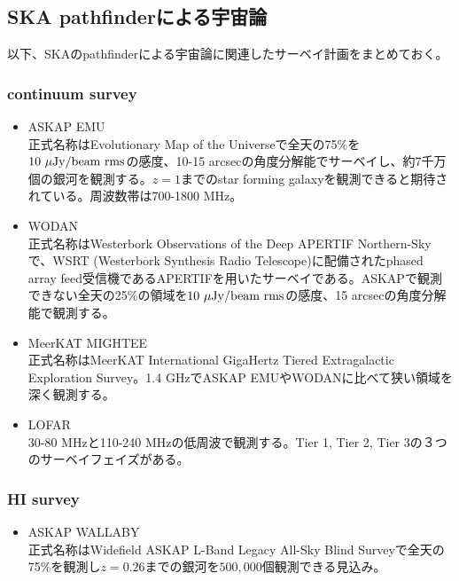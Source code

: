 \subsection{SKA pathfinderによる宇宙論}\label{cosmology.s1.ss3}

以下、SKAのpathfinderによる宇宙論に関連したサーベイ計画をまとめておく。

\subsubsection{continuum survey}
\begin{itemize}
\item ASKAP EMU\\
正式名称はEvolutionary Map of the Universeで全天の75\%を$10~\mu{\rm Jy/beam~rms}$の感度、10-15 arcsecの角度分解能でサーベイし、約7千万個の銀河を観測する。$z=1$までのstar forming galaxyを観測できると期待されている。周波数帯は700-1800 MHz。
\item WODAN\\
正式名称はWesterbork Observations of the Deep APERTIF Northern-Skyで、WSRT (Westerbork Synthesis Radio Telescope)に配備されたphased array feed受信機であるAPERTIFを用いたサーベイである。ASKAPで観測できない全天の25\%の領域を$10~\mu{\rm Jy/beam~rms}$の感度、15 arcsecの角度分解能で観測する。
\item MeerKAT MIGHTEE\\
正式名称はMeerKAT International GigaHertz Tiered Extragalactic Exploration Survey。1.4 GHzでASKAP EMUやWODANに比べて狭い領域を深く観測する。
\item LOFAR\\
30-80 MHzと110-240 MHzの低周波で観測する。Tier 1, Tier 2, Tier 3の３つのサーベイフェイズがある。
\end{itemize}

\subsubsection{HI survey}

\begin{itemize}
\item ASKAP WALLABY\\
正式名称はWidefield ASKAP L-Band Legacy All-Sky Blind Surveyで全天の75\%を観測し$z=0.26$までの銀河を$500,000$個観測できる見込み。
\end{itemize}


